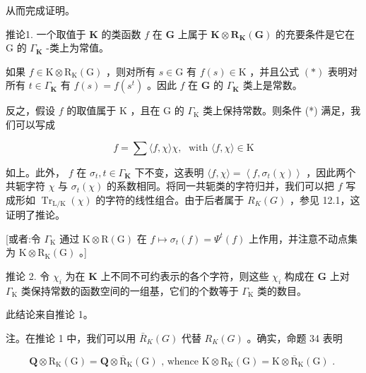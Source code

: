 \documentclass[10pt]{article}
\begin{document}
从而完成证明。

推论1. 一个取值于 \(\mathbf{K}\) 的类函数 \(f\) 在 \(\mathbf{G}\) 上属于 \(\mathbf{K} \otimes  {\mathbf{R}}_{\mathbf{K}}\left( \mathbf{G}\right)\) 的充要条件是它在 \(\mathrm{G}\) 的 \({\Gamma }_{\mathbf{K}}\) -类上为常值。

如果 \(f \in  \mathrm{K} \otimes  {\mathrm{R}}_{\mathrm{K}}\left( \mathrm{G}\right)\) ，则对所有 \(s \in  \mathrm{G}\) 有 \(f\left( s\right)  \in  \mathrm{K}\) ，并且公式 \(\left( *\right)\) 表明对所有 \(t \in  {\Gamma }_{\mathbf{K}}\) 有 \(f\left( s\right)  = f\left( {s}^{t}\right)\) 。因此 \(f\) 在 \(\mathbf{G}\) 的 \({\Gamma }_{\mathbf{K}}\) 类上是常数。

反之，假设 \(f\) 的取值属于 \(\mathrm{K}\) ，且在 G 的 \({\Gamma }_{\mathrm{K}}\) 类上保持常数。则条件 (*) 满足，我们可以写成

\[
f = \sum \langle f,\chi \rangle \chi ,\;\text{ with }\langle f,\chi \rangle  \in  \mathrm{K}
\]

如上。此外， \(f\) 在 \({\sigma }_{t},t \in  {\Gamma }_{\mathbf{K}}\) 下不变，这表明 \(\langle f,\chi \rangle  = \left\langle  {f,{\sigma }_{t}\left( \chi \right) }\right\rangle\) ，因此两个共轭字符 \(\chi\) 与 \({\sigma }_{t}\left( \chi \right)\) 的系数相同。将同一共轭类的字符归并，我们可以把 \(f\) 写成形如 \({\operatorname{Tr}}_{\mathrm{L}/\mathrm{K}}\left( \chi \right)\) 的字符的线性组合。由于后者属于 \({R}_{K}\left( G\right)\) ，参见 12.1，这证明了推论。

[或者:令 \({\Gamma }_{\mathrm{K}}\) 通过 \(\mathrm{K} \otimes  \mathrm{R}\left( \mathrm{G}\right)\) 在 \(f \mapsto  {\sigma }_{t}\left( f\right)  = {\Psi }^{t}\left( f\right)\) 上作用，并注意不动点集为 \(\mathrm{K} \otimes  {\mathrm{R}}_{\mathrm{K}}\left( \mathrm{G}\right)\) 。]

推论 2. 令 \({\chi }_{i}\) 为在 \(\mathbf{K}\) 上不同不可约表示的各个字符，则这些 \({\chi }_{i}\) 构成在 \(\mathbf{G}\) 上对 \({\Gamma }_{\mathrm{K}}\) 类保持常数的函数空间的一组基，它们的个数等于 \({\Gamma }_{\mathrm{K}}\) 类的数目。

此结论来自推论 1。

注。在推论 1 中，我们可以用 \({\bar{R}}_{K}\left( G\right)\) 代替 \({R}_{K}\left( G\right)\) 。确实，命题 34 表明

\[
\mathbf{Q} \otimes  {\mathrm{R}}_{\mathrm{K}}\left( \mathrm{G}\right)  = \mathbf{Q} \otimes  {\overline{\mathrm{R}}}_{\mathrm{K}}\left( \mathrm{G}\right) \text{ , whence }\mathrm{K} \otimes  {\mathrm{R}}_{\mathrm{K}}\left( \mathrm{G}\right)  = \mathrm{K} \otimes  {\overline{\mathrm{R}}}_{\mathrm{K}}\left( \mathrm{G}\right) \text{ . }
\]
\end{document}
